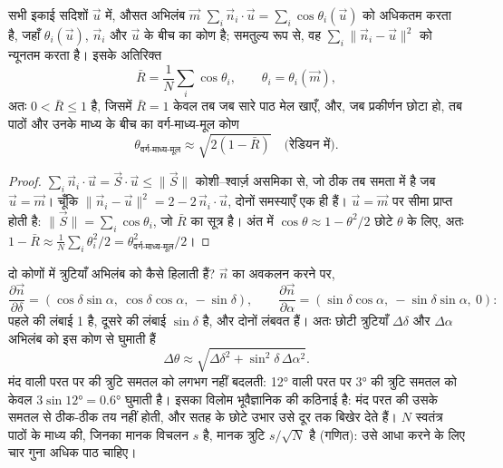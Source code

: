 \begin{proposition}\label{prop:b1:field-lab-methods-1:vector-mean}
सभी इकाई सदिशों $\vec u$ में, औसत अभिलंब $\vec m$ $\sum_i \vec n_i\cdot\vec u = \sum_i \cos\theta_i(\vec u)$ को
अधिकतम करता है, जहाँ $\theta_i(\vec u)$, $\vec n_i$ और $\vec u$ के बीच का कोण है; समतुल्य रूप से, वह
$\sum_i \|\vec n_i - \vec u\|^2$ को न्यूनतम करता है। इसके अतिरिक्त
\[
  \bar R = \frac1N\sum_i \cos\theta_i, \qquad \theta_i = \theta_i(\vec m),
\]
अतः $0 < \bar R \le 1$ है, जिसमें $\bar R = 1$ केवल तब जब सारे पाठ मेल खाएँ, और, जब प्रकीर्णन छोटा हो, तब पाठों
और उनके माध्य के बीच का वर्ग-माध्य-मूल कोण
\[
  \theta_{\text{वर्ग-माध्य-मूल}} \approx \sqrt{2(1 - \bar R)} \quad\text{(रेडियन में)}.
\]
\end{proposition}

\begin{proof}
$\sum_i \vec n_i\cdot\vec u = \vec S\cdot\vec u \le \|\vec S\|$ कोशी–श्वार्ज़ असमिका से, जो ठीक तब समता में है जब
$\vec u = \vec m$। चूँकि $\|\vec n_i - \vec u\|^2 = 2 - 2\,\vec n_i\cdot\vec u$, दोनों समस्याएँ एक ही हैं। $\vec u = \vec m$
पर सीमा प्राप्त होती है: $\|\vec S\| = \sum_i\cos\theta_i$, जो $\bar R$ का सूत्र है। अंत में
$\cos\theta \approx 1 - \theta^2/2$ छोटे $\theta$ के लिए, अतः $1 - \bar R \approx
\frac1N\sum_i\theta_i^2/2 = \theta_{\text{वर्ग-माध्य-मूल}}^2/2$।
\end{proof}

दो कोणों में त्रुटियाँ अभिलंब को कैसे हिलाती हैं? $\vec n$ का अवकलन करने पर,
\[
  \frac{\partial\vec n}{\partial\delta} = (\cos\delta\sin\alpha,\ \cos\delta\cos\alpha,\ -\sin\delta),
  \qquad
  \frac{\partial\vec n}{\partial\alpha} = (\sin\delta\cos\alpha,\ -\sin\delta\sin\alpha,\ 0):
\]
पहले की लंबाई 1 है, दूसरे की लंबाई $\sin\delta$ है, और दोनों लंबवत हैं। अतः छोटी त्रुटियाँ $\Delta\delta$ और
$\Delta\alpha$ अभिलंब को इस कोण से घुमाती हैं
\[
  \Delta\theta \approx \sqrt{\Delta\delta^2 + \sin^2\delta\,\Delta\alpha^2}.
\]
मंद  वाली परत पर  की त्रुटि समतल को लगभग नहीं बदलती: \ang{12}  वाली परत पर \ang{3} की 
त्रुटि समतल को केवल $3\sin\ang{12} = \ang{0.6}$ घुमाती है। इसका विलोम भूवैज्ञानिक की कठिनाई है: मंद परत की
 उसके समतल से ठीक-ठीक तय नहीं होती, और सतह के छोटे उभार उसे दूर तक बिखेर देते हैं। $N$ स्वतंत्र पाठों के माध्य की, जिनका मानक विचलन $s$ है, मानक त्रुटि
$s/\sqrt N$ है (गणित): उसे आधा करने के लिए चार गुना अधिक पाठ
चाहिए।

